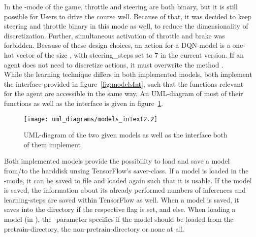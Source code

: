 In the -mode of the game, throttle and steering are both binary, but it is still possible for Users to drive the course well. Because of that, it was decided to keep steering and throttle binary in this mode as well, to reduce the dimensionality of discretization. Further, simultaneous activation of throttle and brake was forbidden. Because of these design choices, an action for a DQN-model is a one-hot vector of the size , with steering\_steps set to 7 in the current version. If an agent does not need to discretize actions, it must overwrite the method .\\

\noindent While the learning technique differs in both implemented models, both implement the interface provided in figure~\ref{fig:modelsInt}, such that the functions relevant for the agent are accessible in the same way. An UML-diagram of most of their functions as well as the interface is given in figure~\ref{fig:modelssmall}. 

\begin{figure}[h]
	\centering 
	\texttt{[image: uml\_diagrams/models\_inText2.2]}
	\caption{UML-diagram of the two given models as well as the interface both of them implement}
	\label{fig:modelssmall}
\end{figure}

Both implemented models provide the possibility to load and save a model from/to the harddisk unsing TensorFlow's saver-class. If a model is loaded in the -mode, it can be saved to file and loaded again such that it is usable. If the model is saved, the information about its already performed numbers of inferences and learning-steps are saved within TensorFlow as well. When a model is saved, it saves into the directory  if the respective flag is set, and  else. When loading a model (in ), the -parameter specifies if the model should be loaded from the pretrain-directory, the non-pretrain-directory or none at all.


